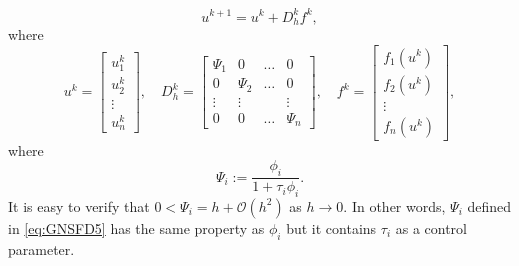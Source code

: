 \documentclass[12pt]{article}
\theoremstyle{definition}
\theoremstyle{remark}
\numberwithin{equation}{section}
\begin{document}
\begin{equation}\label{eq:GNSFD3}
u^{k + 1} = u^k + D^k_hf^k,
\end{equation}
where
\begin{equation}\label{eq:GNSFD4}
u^k = 
\begin{bmatrix}
u_1^k\\
u_2^k\\
\vdots\\
u_n^k
\end{bmatrix},\quad
D_h^k = 
\begin{bmatrix}
\Psi_1&0&\ldots&0\\
0&\Psi_2&\ldots&0\\
\vdots&\vdots&&\vdots\\
0&0&\ldots&\Psi_n
\end{bmatrix},\quad
f^k =
\begin{bmatrix}
f_1(u^k)\\
f_2(u^k)\\
\vdots\\
f_n(u^k)
\end{bmatrix},
\end{equation}
where
\begin{equation}\label{eq:GNSFD5}
\Psi_i := \dfrac{\phi_i}{1 + \tau_i\phi_i}.
\end{equation}
It is easy to verify that $0 < \Psi_i = h + \mathcal{O}(h^2)$ as $h \to 0$. In other words, $\Psi_i$ defined in \ref{eq:GNSFD5} has the same property as $\phi_i$ but it contains $\tau_i$ as a control parameter.
\end{document}

